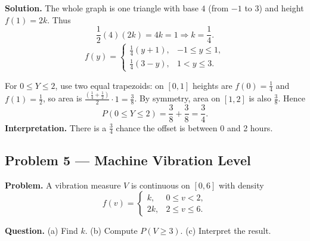 \begin{ExamProblems}
		\textbf{Solution.}
		The whole graph is one triangle with base $4$ (from $-1$ to $3$) and height $f(1)=2k$.
		Thus
		\[
		\frac{1}{2}(4)(2k)=4k=1\Rightarrow k=\frac{1}{4}.
		\]
		\[
		f(y)=\begin{cases}
		\frac{1}{4}(y+1), & -1\le y\le 1,\\
		\frac{1}{4}(3-y), & 1< y\le 3.
		\end{cases}
		\]
		\begin{center}
		\end{center}
		For $0\le Y\le 2$, use two equal trapezoids:
		on $[0,1]$ heights are $f(0)=\frac{1}{4}$ and $f(1)=\frac{1}{2}$,
		so area is $\frac{\left(\frac{1}{4}+\frac{1}{2}\right)}{2}\cdot 1=\frac{3}{8}$.
		By symmetry, area on $[1,2]$ is also $\frac{3}{8}$.
		Hence
		\[
		P(0\le Y\le 2)=\frac{3}{8}+\frac{3}{8}=\frac{3}{4}.
		\]
		\textbf{Interpretation.} There is a $\frac{3}{4}$ chance the offset is between 0 and 2 hours.
		
		
		\item
		\subsection*{Problem 5 — Machine Vibration Level}
		
		\textbf{Problem.}
		A vibration measure $V$ is continuous on $[0,6]$ with density
		\[
		f(v)=\begin{cases}
		k, & 0\le v<2,\\
		2k, & 2\le v\le 6.
		\end{cases}
		\]
		
		\textbf{Question.}
		(a) Find $k$.
		(b) Compute $P(V\ge 3)$.
		(c) Interpret the result.
		

\end{ExamProblems}
